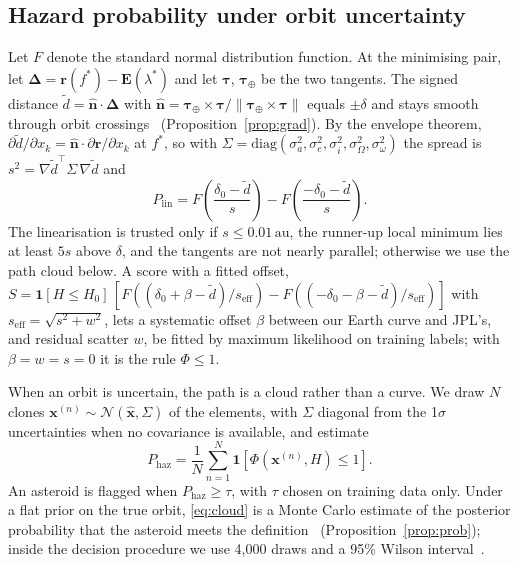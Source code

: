 \documentclass[conference]{IEEEtran}
\newcommand{\au}{\,\mathrm{au}}
\begin{document}
\subsection{Hazard probability under orbit uncertainty}
\label{sec:prob}
Let $F$ denote the standard normal distribution function. At the minimising pair, let $\boldsymbol{\Delta} = \mathbf{r}(f^*) - \mathbf{E}(\lambda^*)$ and let $\boldsymbol{\tau}$, $\boldsymbol{\tau}_\oplus$ be the two tangents. The signed distance $\tilde d = \hat{\mathbf{n}}\cdot\boldsymbol{\Delta}$ with $\hat{\mathbf{n}} = \boldsymbol{\tau}_\oplus\times\boldsymbol{\tau}/\lVert\boldsymbol{\tau}_\oplus\times\boldsymbol{\tau}\rVert$ equals $\pm\delta$ and stays smooth through orbit crossings~\cite{gronchi2007} (Proposition~\ref{prop:grad}). By the envelope theorem, $\partial\tilde d/\partial x_k = \hat{\mathbf{n}}\cdot\partial\mathbf{r}/\partial x_k$ at $f^*$, so with $\Sigma = \mathrm{diag}(\sigma_a^2, \sigma_e^2, \sigma_i^2, \sigma_\Omega^2, \sigma_\omega^2)$ the spread is $s^2 = \nabla\tilde d^{\top}\Sigma\,\nabla\tilde d$ and
\begin{equation}
P_{\mathrm{lin}} = F\!\left(\frac{\delta_0 - \tilde d}{s}\right) - F\!\left(\frac{-\delta_0 - \tilde d}{s}\right).
\label{eq:plin}
\end{equation}
The linearisation is trusted only if $s \le 0.01\au$, the runner-up local minimum lies at least $5s$ above $\delta$, and the tangents are not nearly parallel; otherwise we use the path cloud below. A score with a fitted offset, $S = \mathbf{1}[H \le H_0]\,[F((\delta_0 + \beta - \tilde d)/s_{\mathrm{eff}}) - F((-\delta_0 - \beta - \tilde d)/s_{\mathrm{eff}})]$ with $s_{\mathrm{eff}} = \sqrt{s^2 + w^2}$, lets a systematic offset $\beta$ between our Earth curve and JPL's, and residual scatter $w$, be fitted by maximum likelihood on training labels; with $\beta = w = s = 0$ it is the rule $\Phi \le 1$.

When an orbit is uncertain, the path is a cloud rather than a curve. We draw $N$ clones $\mathbf{x}^{(n)} \sim \mathcal{N}(\hat{\mathbf{x}}, \Sigma)$ of the elements, with $\Sigma$ diagonal from the 1$\sigma$ uncertainties when no covariance is available, and estimate
\begin{equation}
P_{\mathrm{haz}} = \frac{1}{N}\sum_{n=1}^{N} \mathbf{1}\!\left[ \Phi(\mathbf{x}^{(n)}, H) \le 1 \right].
\label{eq:cloud}
\end{equation}
An asteroid is flagged when $P_{\mathrm{haz}} \ge \tau$, with $\tau$ chosen on training data only. Under a flat prior on the true orbit, \eqref{eq:cloud} is a Monte Carlo estimate of the posterior probability that the asteroid meets the definition~\cite{milani_gronchi2009} (Proposition~\ref{prop:prob}); inside the decision procedure we use 4,000 draws and a 95\% Wilson interval~\cite{wilson1927}.
\end{document}
